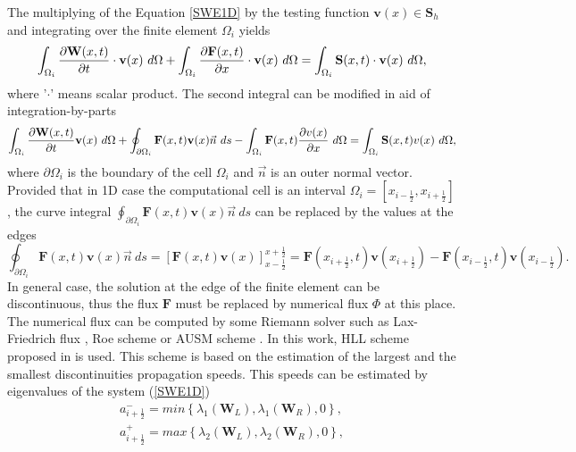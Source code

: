 The multiplying of the Equation \ref{SWE1D} by the testing function $\textbf{v}(x)\in \mathbf{S}_h$ and integrating over the finite element $\Omega_i$ yields
\begin{equation}\label{testF}
\int_{\Omega_i}\parc{\mathbf{W}(x,t)}{t} \cdot \textbf{v}(x)  \ d\Omega +\int_{\Omega_i} \parc{\mathbf{F}(x,t)}{x} \cdot \mathbf{v}(x) \ d\Omega=\int_{\Omega_i}\mathbf{S}(x,t) \cdot \textbf{v}(x) \ d\Omega,
\end{equation}
where '$\cdot$' means scalar product. The second integral can be modified in aid of integration-by-parts
\begin{equation}\label{testF1D}
\int_{\Omega_i}\parc{\mathbf{W}(x,t)}{t} \textbf{v}(x)  \ d\Omega +\oint_{\partial \Omega_i} \mathbf{F}(x,t) \textbf{v}(x) \vec{n} \ ds-\int_{\Omega_i} \mathbf{F}(x,t)\parc{v(x)}{x} \ d\Omega=\int_{\Omega_i}\mathbf{S}(x,t)v(x) \ d\Omega,
\end{equation}
where $\partial \Omega_i$ is the boundary of the cell $\Omega_i$ and $\vec{n}$ is an outer normal vector. Provided that in 1D case the computational cell is an interval $\Omega_i=[x_{i-\frac12},x_{i+\frac12}]$, the curve integral $\oint_{\partial \Omega_i} \mathbf{F}(x,t) \mathbf{v}(x)\vec{n} \ ds$ can be replaced by the values at the edges
\begin{equation}
\oint_{\partial \Omega_i} \mathbf{F}(x,t) \mathbf{v}(x)\vec{n} \ ds=\left[ \mathbf{F}(x,t) \mathbf{v}(x)\right]_{x-\frac12}^{x+\frac12}= \mathbf{F}(x_{i+\frac12},t) \mathbf{v}(x_{i+\frac12})-\mathbf{F}(x_{i-\frac12},t) \mathbf{v}(x_{i-\frac12}).
\end{equation}
In general case, the solution at the edge of the finite element can be discontinuous, thus the flux $\mathbf{F}$  must be replaced by numerical flux $\Phi$ at this place. The numerical flux can be computed by some Riemann solver such as Lax-Friedrich flux \cite{Lax1954}, Roe scheme \cite{roe} or AUSM scheme \cite{ausm}. In this work, HLL scheme proposed in \cite{harten1983} is used. This scheme is based on the estimation of the largest and the smallest discontinuities propagation speeds. This speeds can be estimated by eigenvalues of the system (\ref{SWE1D})
\begin{equation}\label{rychlosticky}
 \begin{array}{ccc}
a_{i+\frac12}^-=min\left\{\lambda_1\left(\mathbf{W}_L\right),\lambda_1\left(\mathbf{W}_R\right),0\right\},\\
a_{i+\frac12}^+=max\left\{\lambda_2\left(\mathbf{W}_L\right),\lambda_2\left(\mathbf{W}_R\right),0\right\},
\end{array}
\end{equation}
